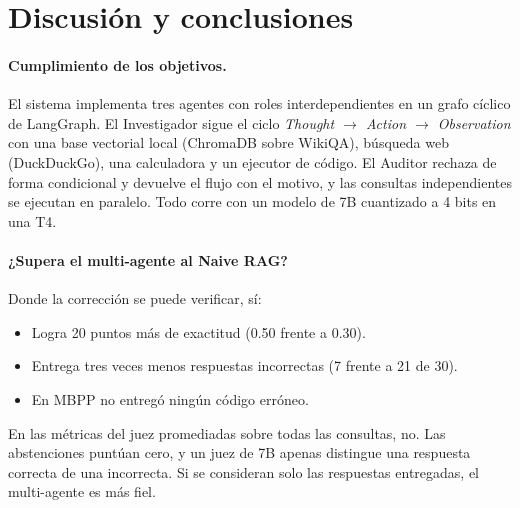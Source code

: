 \section{Discusión y conclusiones}\label{sec:conclusiones}

\paragraph{Cumplimiento de los objetivos.}
El sistema implementa tres agentes con roles interdependientes en un grafo cíclico de LangGraph.
El Investigador sigue el ciclo \emph{Thought $\rightarrow$ Action $\rightarrow$ Observation} con una base vectorial local (ChromaDB sobre WikiQA), búsqueda web (DuckDuckGo), una calculadora y un ejecutor de código.
El Auditor rechaza de forma condicional y devuelve el flujo con el motivo, y las consultas independientes se ejecutan en paralelo.
Todo corre con un modelo de 7B cuantizado a 4 bits en una T4.

\paragraph{¿Supera el multi-agente al Naive RAG?}
Donde la corrección se puede verificar, sí:
\begin{itemize}
  \item Logra 20 puntos más de exactitud (0.50 frente a 0.30).
  \item Entrega tres veces menos respuestas incorrectas (7 frente a 21 de 30).
  \item En MBPP no entregó ningún código erróneo.
\end{itemize}
En las métricas del juez promediadas sobre todas las consultas, no.
Las abstenciones puntúan cero, y un juez de 7B apenas distingue una respuesta correcta de una incorrecta.
Si se consideran solo las respuestas entregadas, el multi-agente es más fiel.

